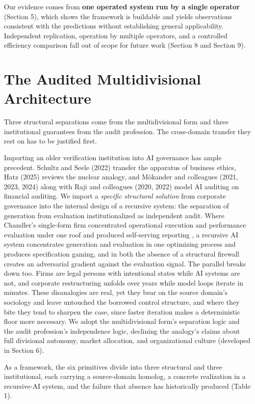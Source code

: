 \documentclass[11pt]{article}
\begin{document}
Our evidence comes from \textbf{one operated system run by a single operator} (Section 5), which shows the framework is buildable and yields observations consistent with the predictions without establishing general applicability. Independent replication, operation by multiple operators, and a controlled efficiency comparison fall out of scope for future work (Section 8 and Section 9).

\section{The Audited Multidivisional Architecture}

Three structural separations come from the multidivisional form and three institutional guarantees from the audit profession. The cross-domain transfer they rest on has to be justified first.

Importing an older verification institution into AI governance has ample precedent. Schultz and Seele (2022) transfer the apparatus of business ethics, Hatz (2025) reviews the nuclear analogy, and Mökander and colleagues (2021, 2023, 2024) along with Raji and colleagues (2020, 2022) model AI auditing on financial auditing. We import a \emph{specific structural solution} from corporate governance into the internal design of a recursive system: the separation of generation from evaluation institutionalized as independent audit. Where Chandler's single-form firm concentrated operational execution and performance evaluation under one roof and produced self-serving reporting \citep{williamson1975}, a recursive AI system concentrates generation and evaluation in one optimizing process and produces specification gaming, and in both the absence of a structural firewall creates an adversarial gradient against the evaluation signal. The parallel breaks down too. Firms are legal persons with intentional states while AI systems are not, and corporate restructuring unfolds over years while model loops iterate in minutes. These disanalogies are real, yet they bear on the source domain's sociology and leave untouched the borrowed control structure, and where they bite they tend to sharpen the case, since faster iteration makes a deterministic floor more necessary. We adopt the multidivisional form's separation logic and the audit profession's independence logic, declining the analogy's claims about full divisional autonomy, market allocation, and organizational culture (developed in Section 6).

As a framework, the six primitives divide into three structural and three institutional, each carrying a source-domain homolog, a concrete realization in a recursive-AI system, and the failure that absence has historically produced (Table 1).
\end{document}
